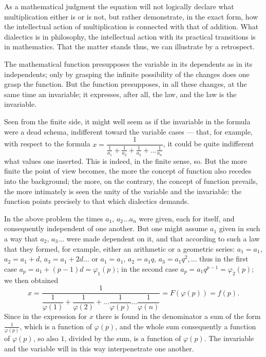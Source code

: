 \documentclass[12pt]{book}
\begin{document}
As a mathematical judgment the equation will not logically declare what
multiplication either is or is not, but rather demonstrate, in the exact form,
how the intellectual action of multiplication is connected with that of addition.
What dialectics is in philosophy, the intellectual action with its practical
transitions is in mathematics. That the matter stands thus, we can illustrate by
a retrospect.

The mathematical function presupposes the variable in its dependents as in its
independents; only by grasping the infinite possibility of the changes does one
grasp the function. But the function presupposes, in all these changes, at the
same time an invariable; it expresses, after all, the law, and the law is the
invariable.

Seen from the finite side, it might well seem as if the invariable in the formula
were a dead schema, indifferent toward the variable cases --- that, for example,
with respect to the formula $x = \dfrac{1}{\frac{1}{a_1}+\frac{1}{a_2}
+\frac{1}{a_3}+\dots\frac{1}{a_n}}$, it could be quite indifferent what values
one inserted. This is indeed, in the finite sense, so. But the more finite the
point of view becomes, the more the concept of function also recedes into the
background; the more, on the contrary, the concept of function prevails, the more
intimately is seen the unity of the variable and the invariable: the function
points precisely to that which dialectics demands.

In the above problem the times $a_1$, $a_2\dots a_n$ were given, each for itself,
and consequently independent of one another. But one might assume $a_1$ given in
such a way that $a_2$, $a_3\dots$ were made dependent on it, and that according to
such a law that they formed, for example, either an arithmetic or a geometric
series: $a_1 = a_1$, $a_2 = a_1 + d$, $a_3 = a_1 + 2d\dots$ or $a_1 = a_1$,
$a_2 = a_1 q$, $a_3 = a_1 q^{2},\dots$ thus in the first case $a_p = a_1 + (p-1)d =
\varphi_1(p)$; in the second case $a_p = a_1 q^{p-1} = \varphi_2(p)$; we then
obtained
\[
x = \frac{1}{\dfrac{1}{\varphi(1)}+\dfrac{1}{\varphi(2)}+\dots\dfrac{1}{\varphi(p)}
\dots\dfrac{1}{\varphi(n)}} = F(\varphi(p)) = f(p).
\]
Since in the expression for $x$ there is found in the denominator a sum of the
form $\frac{1}{\varphi(p)}$, which is a function of $\varphi(p)$, and the whole
sum consequently a function of $\varphi(p)$, so also $1$, divided by the sum, is a
function of $\varphi(p)$. The invariable and the variable will in this way
interpenetrate one another.
\end{document}
